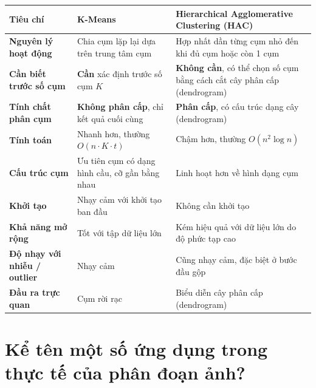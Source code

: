 \documentclass[12pt]{article}
\begin{document}
	\begin{longtable}{|>{\raggedright\arraybackslash}p{4cm}|>{\raggedright\arraybackslash}p{5.5cm}|>{\raggedright\arraybackslash}p{5.5cm}|}
	\hline
	\textbf{Tiêu chí} & \textbf{K-Means} & \textbf{Hierarchical Agglomerative Clustering (HAC)} \\
	\hline
	\textbf{Nguyên lý hoạt động} & Chia cụm lặp lại dựa trên trung tâm cụm & Hợp nhất dần từng cụm nhỏ đến khi đủ cụm hoặc còn 1 cụm \\
	\hline
	\textbf{Cần biết trước số cụm} & \textbf{Cần} xác định trước số cụm $K$ & \textbf{Không cần}, có thể chọn số cụm bằng cách cắt cây phân cấp (dendrogram) \\
	\hline
	\textbf{Tính chất phân cụm} & \textbf{Không phân cấp}, chỉ kết quả cuối cùng & \textbf{Phân cấp}, có cấu trúc dạng cây (dendrogram) \\
	\hline
	\textbf{Tính toán} & Nhanh hơn, thường $O(n \cdot K \cdot t)$ & Chậm hơn, thường $O(n^2 \log n)$ \\
	\hline
	\textbf{Cấu trúc cụm} & Ưu tiên cụm có dạng hình cầu, cỡ gần bằng nhau & Linh hoạt hơn về hình dạng cụm \\
	\hline
	\textbf{Khởi tạo} & Nhạy cảm với khởi tạo ban đầu & Không cần khởi tạo \\
	\hline
	\textbf{Khả năng mở rộng} & Tốt với tập dữ liệu lớn & Kém hiệu quả với dữ liệu lớn do độ phức tạp cao \\
	\hline
	\textbf{Độ nhạy với nhiễu / outlier} & Nhạy cảm & Cũng nhạy cảm, đặc biệt ở bước đầu gộp \\
	\hline
	\textbf{Đầu ra trực quan} & Cụm rời rạc & Biểu diễn cây phân cấp (dendrogram) \\
	\hline
	\end{longtable}
	
	\section{Kể tên một số ứng dụng trong thực tế của phân đoạn ảnh?}
	
\end{document}
